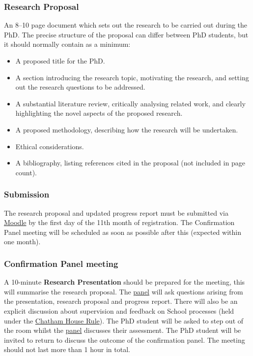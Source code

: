 \documentclass[12pt,a4paper]{article}
\begin{document}
\subsubsection{Research Proposal}
An 8--10 page document which sets out the research to be carried out during the PhD. The precise structure of the proposal can differ between PhD students, but it should normally contain as a minimum:
\begin{itemize}
	\item A proposed title for the PhD.
	\item A section introducing the research topic, motivating the research, and setting out the research questions to be addressed.
	\item A substantial literature review, critically analysing related work, and clearly highlighting the novel aspects of the proposed research.
	\item A proposed methodology, describing how the research will be undertaken.
	\item Ethical considerations.
	\item A bibliography, listing references cited in the proposal (not included in page count).
\end{itemize}

\subsubsection{Submission}
The research proposal and updated progress report must be submitted via \href{https://modules.lancaster.ac.uk/course/view.php?id=7050}{Moodle} by the first day of the 11th month of registration. The Confirmation Panel meeting will be scheduled as soon as possible after this (expected within one month).

\subsubsection{Confirmation Panel meeting}
A 10-minute \textbf{Research Presentation} should be prepared for the meeting, this will summarise the research proposal. The \hyperref[sec:panel]{panel} will ask questions arising from the presentation, research proposal and progress report. There will also be an explicit discussion about supervision and feedback on School processes (held under the \href{https://www.chathamhouse.org/chatham-house-rule}{Chatham House Rule}). The PhD student will be asked to step out of the room whilst the \hyperref[sec:panel]{panel} discusses their assessment. The PhD student will be invited to return to discuss the outcome of the confirmation panel. The meeting should not last more than 1 hour in total.
\end{document}
